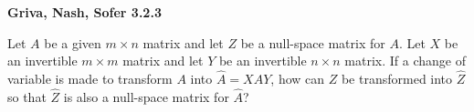 \textbf{Griva, Nash, Sofer 3.2.3}

Let $A$ be a given $m \times n$ matrix and let $Z$ be a null-space matrix for $A$. Let $X$ be an invertible $m \times m$
matrix and let $Y$ be an invertible $n \times n$ matrix. If a change of variable is made to transform $A$ into 
$\hat{A} = XAY$, how can $Z$ be transformed into $\hat{Z}$ so that $\hat{Z}$ is also a null-space matrix for $\hat{A}$?

\begin{solution}
  \ \\
\end{solution}